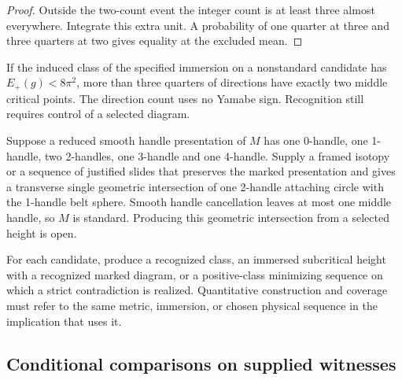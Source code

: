 \begin{proof}
\leanok
Outside the two-count event the integer count is at least three almost
everywhere. Integrate this extra unit. A probability of one quarter
at three and three quarters at two gives equality at the excluded mean.
\end{proof}

\begin{corollary}
\label{cor:routes-subcritical-heights}
If the induced class of the specified immersion on a nonstandard
candidate has \(E_+(g)<8\pi^2\), more than three quarters of directions
have exactly two middle critical points. The direction count uses no
Yamabe sign. Recognition still requires control of a selected diagram.
\end{corollary}

\begin{proposition}
\label{prop:routes-mixed-cancellation}
Suppose a reduced smooth handle presentation of \(M\) has one 0-handle,
one 1-handle, two 2-handles, one 3-handle and one 4-handle. Supply a
framed isotopy or a sequence of justified slides that preserves the
marked presentation and gives a transverse single geometric
intersection of one 2-handle attaching circle with the 1-handle belt
sphere. Smooth handle cancellation leaves at most one middle handle,
so \(M\) is standard. Producing this geometric intersection from a
selected height is open.
\end{proposition}

\begin{openproblem}
\label{problem:routes-coverage}
For each candidate, produce a recognized class, an immersed subcritical
height with a recognized marked diagram, or a positive-class minimizing
sequence on which a strict contradiction is realized. Quantitative
construction and coverage must refer to the same metric, immersion,
or chosen physical sequence in the implication that uses it.
\end{openproblem}

\subsection{Conditional comparisons on supplied witnesses}

